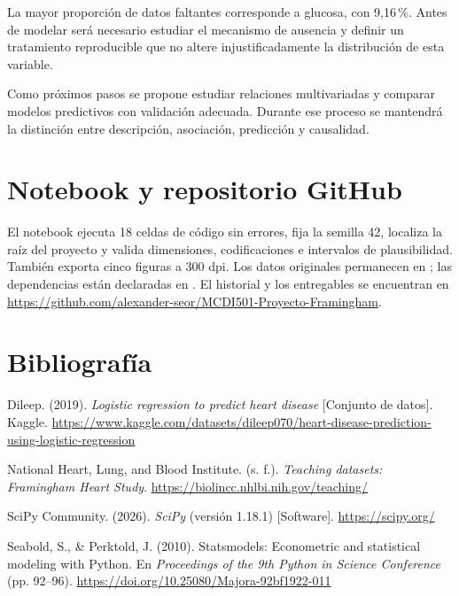 \documentclass[10pt,a4paper]{article}
\newcommand{\proyRepo}{\url{https://github.com/alexander-seor/MCDI501-Proyecto-Framingham}}
\begin{document}
La mayor proporción de datos faltantes corresponde a glucosa, con 9,16\,\%. Antes de modelar será necesario estudiar el mecanismo de ausencia y definir un tratamiento reproducible que no altere injustificadamente la distribución de esta variable.

Como próximos pasos se propone estudiar relaciones multivariadas y comparar modelos predictivos con validación adecuada. Durante ese proceso se mantendrá la distinción entre descripción, asociación, predicción y causalidad.

\section{Notebook y repositorio GitHub}

El notebook  ejecuta 18 celdas de código sin errores, fija la semilla 42, localiza la raíz del proyecto y valida dimensiones, codificaciones e intervalos de plausibilidad. También exporta cinco figuras a 300 dpi. Los datos originales permanecen en ; las dependencias están declaradas en . El historial y los entregables se encuentran en \proyRepo.

\section*{Bibliografía}
\raggedright

\hangindent=1.27cm
Dileep. (2019). \textit{Logistic regression to predict heart disease} [Conjunto de datos]. Kaggle. \url{https://www.kaggle.com/datasets/dileep070/heart-disease-prediction-using-logistic-regression}\par

\hangindent=1.27cm
National Heart, Lung, and Blood Institute. (s. f.). \textit{Teaching datasets: Framingham Heart Study}. \url{https://biolincc.nhlbi.nih.gov/teaching/}\par

\hangindent=1.27cm
SciPy Community. (2026). \textit{SciPy} (versión 1.18.1) [Software]. \url{https://scipy.org/}\par

\hangindent=1.27cm
Seabold, S., \& Perktold, J. (2010). Statsmodels: Econometric and statistical modeling with Python. En \textit{Proceedings of the 9th Python in Science Conference} (pp. 92--96). \url{https://doi.org/10.25080/Majora-92bf1922-011}\par
\end{document}
